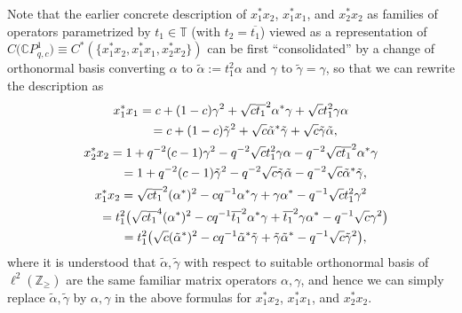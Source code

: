 \documentclass[11pt]{article}
\numberwithin{equation}{section}
\begin{document}
Note that the earlier concrete description of $x_{1}^{\ast}x_{2}$,
$x_{1}^{\ast}x_{1}$, and $x_{2}^{\ast}x_{2}$ as families of operators
parametrized by $t_{1}\in\mathbb{T}$ (with $t_{2}=\overline{t_{1}}$) viewed as
a representation of $C\big(\mathbb{C}P_{q,c}^{1}\big) \equiv C^{\ast
} ( \{ x_{1}^{\ast}x_{2},x_{1}^{\ast}x_{1},\allowbreak x_{2}^{\ast}
x_{2} \} ) $ can be first ``consolidated'' by a change of orthonormal basis converting
$\alpha$ to $\tilde{\alpha}:=t_{1}^{2}\alpha$ and $\gamma$ to $\tilde{\gamma
}=\gamma$, so that we can rewrite the description as
\begin{gather*}
x_{1}^{\ast}x_{1} =c+(1-c) \gamma^{2}+\sqrt{c}%
\overline{t_{1}}^{2}\alpha^{\ast}\gamma+\sqrt{c}t_{1}^{2}\gamma\alpha\\
\hphantom{x_{1}^{\ast}x_{1}}{} =c+(1-c) \tilde{\gamma}^{2}+\sqrt{c}\tilde{\alpha}^{\ast
}\tilde{\gamma}+\sqrt{c}\tilde{\gamma}\tilde{\alpha},
\\
x_{2}^{\ast}x_{2} =1+q^{-2}(c-1) \gamma^{2}-q^{-2}\sqrt
{c}t_{1}^{2}\gamma\alpha-q^{-2}\sqrt{c}\overline{t_{1}}^{2}\alpha^{\ast}%
\gamma\\
\hphantom{x_{2}^{\ast}x_{2}}{} =1+q^{-2}(c-1) \tilde{\gamma}^{2}-q^{-2}\sqrt{c}\tilde
{\gamma}\tilde{\alpha}-q^{-2}\sqrt{c}\tilde{\alpha}^{\ast}\tilde{\gamma},
\\
x_{1}^{\ast}x_{2} =\sqrt{c}\overline{t_{1}}^{2} ( \alpha^{\ast
} ) ^{2}-cq^{-1}\alpha^{\ast}\gamma+\gamma\alpha^{\ast}-q^{-1}\sqrt
{c}t_{1}^{2}\gamma^{2}\\
\hphantom{x_{1}^{\ast}x_{2}}{}
 =t_{1}^{2}\big( \sqrt{c}\overline{t_{1}}^{4} ( \alpha^{\ast} )
^{2}-cq^{-1}\overline{t_{1}}^{2}\alpha^{\ast}\gamma+\overline{t_{1}}^{2}%
\gamma\alpha^{\ast}-q^{-1}\sqrt{c}\gamma^{2}\big) \\
\hphantom{x_{1}^{\ast}x_{2}}{} =t_{1}^{2}\big( \sqrt{c} ( \tilde{\alpha}^{\ast} )
^{2}-cq^{-1}\tilde{\alpha}^{\ast}\tilde{\gamma}+\tilde{\gamma}\tilde{\alpha
}^{\ast}-q^{-1}\sqrt{c}\tilde{\gamma}^{2}\big) ,
\end{gather*}
where it is understood that $\tilde{\alpha},\tilde{\gamma}$ with respect to
suitable orthonormal basis of $\ell^{2} ( \mathbb{Z}_{\geq} ) $ are
the same familiar matrix operators $\alpha,\gamma$, and hence we can simply
replace $\tilde{\alpha},\tilde{\gamma}$ by $\alpha,\gamma$ in the above
formulas for $x_{1}^{\ast}x_{2}$, $x_{1}^{\ast}x_{1}$, and $x_{2}^{\ast}x_{2}$.
\end{document}
